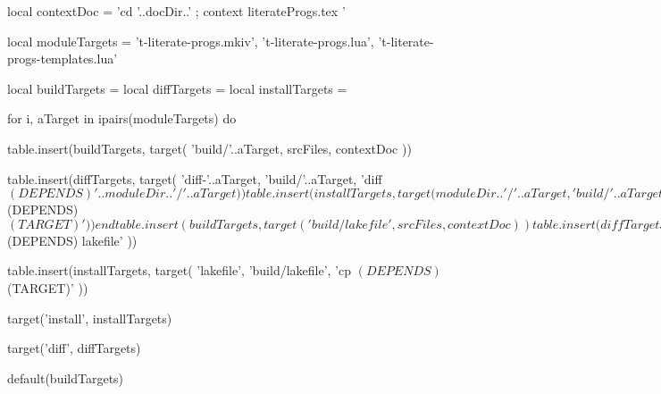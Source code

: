local contextDoc = 
  'cd '..docDir..' ; context literateProgs.tex '

local moduleTargets = {
  't-literate-progs.mkiv',
  't-literate-progs.lua',
  't-literate-progs-templates.lua'
}

local buildTargets   = { }
local diffTargets    = { }
local installTargets = { }

for i, aTarget in ipairs(moduleTargets) do

  table.insert(buildTargets, target(
    'build/'..aTarget,
    srcFiles,
    contextDoc
  ))

  table.insert(diffTargets, target(
    'diff-'..aTarget,
    'build/'..aTarget,
    'diff $(DEPENDS) '..moduleDir..'/'..aTarget
  ))

  table.insert(installTargets, target(
    moduleDir..'/'..aTarget,
    'build/'..aTarget,
    'cp $(DEPENDS) $(TARGET)'
  ))
end

table.insert(buildTargets, target(
  'build/lakefile',
  srcFiles,
  contextDoc
))

table.insert(diffTargets, target(
  'diff-lakefile',
  'build/lakefile',
  'diff $(DEPENDS) lakefile'
))

table.insert(installTargets, target(
  'lakefile',
  'build/lakefile',
  'cp $(DEPENDS) $(TARGET)'
))

target('install', installTargets)

target('diff', diffTargets)

default(buildTargets)

\stopLakefile

\stopchapter